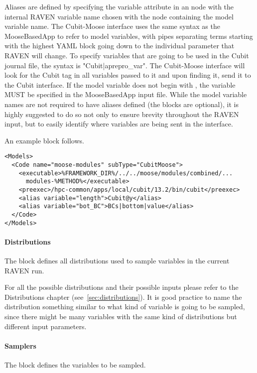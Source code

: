 Aliases are defined by specifying the variable attribute in an  node with
the internal RAVEN variable name chosen with the node containing the model
variable name.  The Cubit-Moose interface uses the same syntax as the
MooseBasedApp to refer to model variables, with pipes separating terms starting
with the highest YAML block going down to the individual parameter that RAVEN
will change.  To specify variables that are going to be used in the Cubit
journal file, the syntax is "Cubit|aprepro\_var".  The Cubit-Moose interface
will look for the Cubit tag in all variables passed to it and upon finding it,
send it to the Cubit interface.  If the model variable does not begin with ,
the variable MUST be specified in the MooseBasedApp input file.  While the model
variable names are not required to have aliases defined (the 
blocks are optional), it is highly suggested to do so not only to ensure brevity
throughout the RAVEN input, but to easily identify where variables are being sent
in the interface.

An example  block follows.

\begin{lstlisting}[style=XML]
<Models>
  <Code name="moose-modules" subType="CubitMoose">
    <executable>%FRAMEWORK_DIR%/../../moose/modules/combined/...
      modules-%METHOD%</executable>
    <preexec>/hpc-common/apps/local/cubit/13.2/bin/cubit</preexec>
    <alias variable="length">Cubit@y</alias>
    <alias variable="bot_BC">BCs|bottom|value</alias>
  </Code>
</Models>
\end{lstlisting}

\paragraph{Distributions}
The  block defines all distributions used to
sample variables in the current RAVEN run.

For all the possible distributions and their possible inputs please
refer to the Distributions chapter (see~\ref{sec:distributions}).
%
It is good practice to name the distribution something similar to what kind of
variable is going to be sampled, since there might be many variables with the
same kind of distributions but different input parameters.

\paragraph{Samplers}
The  block defines the variables to be sampled.

